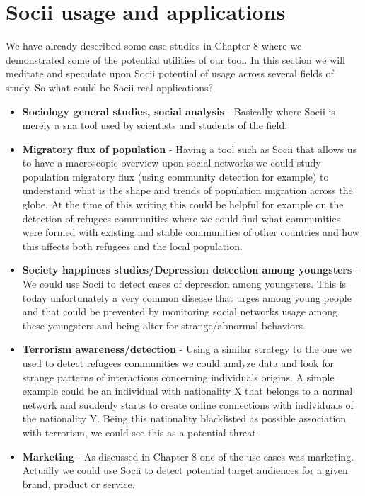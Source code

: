 \section{Socii usage and applications}
We have already described some case studies in Chapter 8 where we demonstrated some of the potential utilities of our tool. In this section we will meditate and speculate upon Socii potential of usage across several fields of study. So what could be Socii real applications?

\begin{itemize}
    \item \textbf{Sociology general studies, social analysis} - Basically where Socii is merely a \gls{sna} tool used by scientists and students of the field.
    \item \textbf{Migratory flux of population} - Having a tool such as Socii that allows us to have a macroscopic overview upon social networks we could study population migratory flux (using community detection for example) to understand what is the shape and trends of population migration across the globe. At the time of this writing this could be helpful for example on the detection of refugees communities where we could find what communities were formed with existing and stable communities of other countries and how this affects both refugees and the local population.
    \item \textbf{Society happiness studies/Depression detection among youngsters} - We could use Socii to detect cases of depression among youngsters. This is today unfortunately a very common disease that urges among young people and that could be prevented by monitoring social networks usage among these youngsters and being alter
    for strange/abnormal behaviors.
    \item \textbf{Terrorism awareness/detection} - Using a similar strategy to the one we used to detect refugees communities we could analyze data and look for strange patterns of interactions concerning individuals origins. A simple example could be an individual with nationality X that belongs to a normal network and suddenly starts to create online connections with individuals of the nationality Y. Being this nationality blacklisted as possible association with terrorism, we could see this as a potential threat.
    \item \textbf{Marketing} - As discussed in Chapter 8 one of the use cases was marketing. Actually we could use Socii to detect potential target audiences for a given brand, product or service.
\end{itemize}

